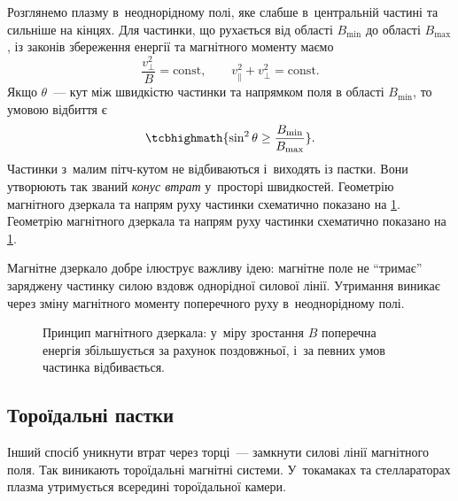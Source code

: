 Розглянемо плазму в~неоднорідному полі, яке слабше в~центральній частині та сильніше на кінцях. Для частинки, що рухається від області $B_{\min}$ до області $B_{\max}$, із законів збереження енергії та магнітного моменту маємо
\begin{equation}
	\frac{v_{\perp}^2}{B}=\mathrm{const},
	\qquad
	v_\parallel^2+v_\perp^2=\mathrm{const}.
\end{equation}
Якщо $\theta$~--- кут між швидкістю частинки та напрямком поля в області $B_{\min}$, то умовою відбиття є
\begin{equation}
	\tcbhighmath{
		\sin^2\theta
		\geq
		\frac{B_{\min}}{B_{\max}}
	}.
\end{equation}
Частинки з~малим пітч-кутом не відбиваються і~виходять із пастки. Вони утворюють так званий \emph{конус втрат} у~просторі швидкостей. Геометрію магнітного дзеркала та напрям руху частинки схематично показано на \ref{fig:magnetic-mirror}. Геометрію магнітного дзеркала та напрям руху частинки схематично показано на \ref{fig:magnetic-mirror}.

Магнітне дзеркало добре ілюструє важливу ідею: магнітне поле не \enquote{тримає} заряджену частинку силою вздовж однорідної силової лінії. Утримання виникає через зміну магнітного моменту поперечного руху в~неоднорідному полі.

\begin{figure}[htbp]\centering
	\caption{Принцип магнітного дзеркала: у~міру зростання $B$ поперечна енергія збільшується за рахунок поздовжньої, і~за певних умов частинка відбивається.}\label{fig:magnetic-mirror}
\end{figure}



\subsection{Тороїдальні пастки}



Інший спосіб уникнути втрат через торці~--- замкнути силові лінії магнітного поля. Так виникають тороїдальні магнітні системи. У~токамаках та стеллараторах плазма утримується всередині тороїдальної камери.

